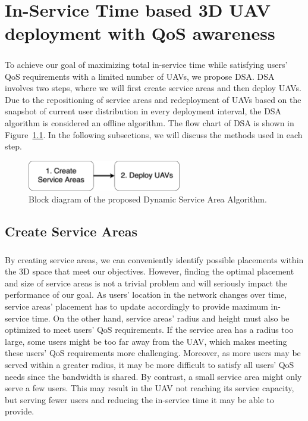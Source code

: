 \documentclass[a4paper,12pt]{report}
\begin{document}
\chapter{In-Service Time based 3D UAV deployment with QoS awareness}
\paragraph{}
To achieve our goal of maximizing total in-service time while satisfying users' QoS requirements with a limited number of UAVs, we propose DSA. DSA involves two steps, where we will first create service areas and then deploy UAVs. Due to the repositioning of service areas and redeployment of UAVs based on the snapshot of current user distribution in every deployment interval, the DSA algorithm is considered an offline algorithm. The flow chart of DSA is shown in Figure~\ref{fig:DSA Block Diagram}. In the following subsections, we will discuss the methods used in each step.

\begin{figure} [ht]
    \centering
    \includegraphics[width=0.6\textwidth]{Figure 3.png}
    \caption{Block diagram of the proposed Dynamic Service Area Algorithm.}
    \label{fig:DSA Block Diagram}
\end{figure}


\section{Create Service Areas}
\paragraph{}
By creating service areas, we can conveniently identify possible placements within the 3D space that meet our objectives. However, finding the optimal placement and size of service areas is not a trivial problem and will seriously impact the performance of our goal. As users' location in the network changes over time, service areas' placement has to update accordingly to provide maximum in-service time. On the other hand, service areas' radius and height must also be optimized to meet users' QoS requirements. If the service area has a radius too large, some users might be too far away from the UAV, which makes meeting these users' QoS requirements more challenging. Moreover, as more users may be served within a greater radius, it may be more difficult to satisfy all users' QoS needs since the bandwidth is shared. By contrast, a small service area might only serve a few users. This may result in the UAV not reaching its service capacity, but serving fewer users and reducing the in-service time it may be able to provide.
\end{document}
